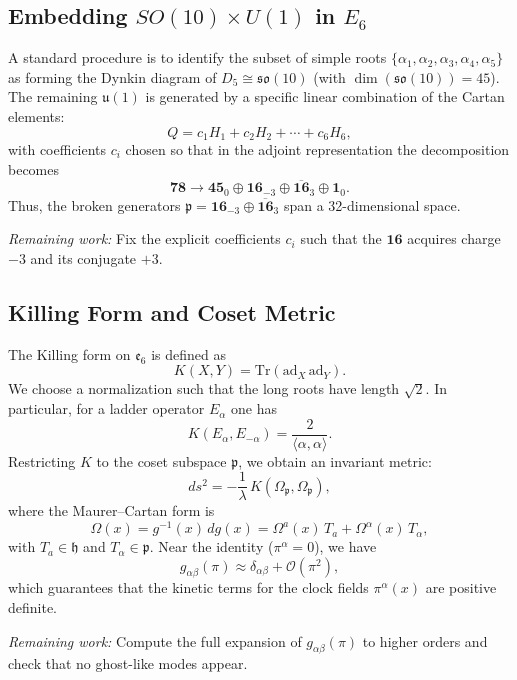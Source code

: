 \documentclass[aps,prd,preprint,groupedaddress]{revtex4-2}
\begin{document}
\subsection{Embedding \(SO(10)\times U(1)\) in \(E_6\)}
A standard procedure is to identify the subset of simple roots \(\{\alpha_1,\alpha_2,\alpha_3,\alpha_4,\alpha_5\}\) as forming the Dynkin diagram of \(D_5 \cong \mathfrak{so}(10)\) (with \(\dim(\mathfrak{so}(10))=45\)). The remaining \(\mathfrak{u}(1)\) is generated by a specific linear combination of the Cartan elements:
\[
Q = c_1 H_1 + c_2 H_2 + \cdots + c_6 H_6,
\]
with coefficients \(c_i\) chosen so that in the adjoint representation the decomposition becomes
\[
\mathbf{78} \to \mathbf{45}_0 \oplus \mathbf{16}_{-3} \oplus \overline{\mathbf{16}}_{3} \oplus \mathbf{1}_0.
\]
Thus, the broken generators \(\mathfrak{p} = \mathbf{16}_{-3}\oplus\overline{\mathbf{16}}_{3}\) span a 32-dimensional space.

\emph{Remaining work:} Fix the explicit coefficients \(c_i\) such that the \(\mathbf{16}\) acquires charge \(-3\) and its conjugate \(+3\).

\subsection{Killing Form and Coset Metric}
The Killing form on \(\mathfrak{e}_6\) is defined as
\[
K(X,Y) = \mathrm{Tr}(\mathrm{ad}_X\,\mathrm{ad}_Y).
\]
We choose a normalization such that the long roots have length \(\sqrt{2}\). In particular, for a ladder operator \(E_\alpha\) one has
\[
K(E_\alpha, E_{-\alpha}) = \frac{2}{\langle \alpha, \alpha\rangle}.
\]
Restricting \(K\) to the coset subspace \(\mathfrak{p}\), we obtain an invariant metric:
\[
ds^2 = -\frac{1}{\lambda}\, K(\Omega_{\mathfrak{p}},\Omega_{\mathfrak{p}}),
\]
where the Maurer–Cartan form is
\[
\Omega(x) = g^{-1}(x)\,dg(x) = \Omega^a(x)\,T_a + \Omega^\alpha(x)\,T_\alpha,
\]
with \(T_a\in \mathfrak{h}\) and \(T_\alpha\in \mathfrak{p}\). Near the identity (\(\pi^\alpha=0\)), we have
\[
g_{\alpha\beta}(\pi) \approx \delta_{\alpha\beta} + \mathcal{O}(\pi^2),
\]
which guarantees that the kinetic terms for the clock fields \(\pi^\alpha(x)\) are positive definite.

\emph{Remaining work:} Compute the full expansion of \(g_{\alpha\beta}(\pi)\) to higher orders and check that no ghost-like modes appear.
\end{document}
